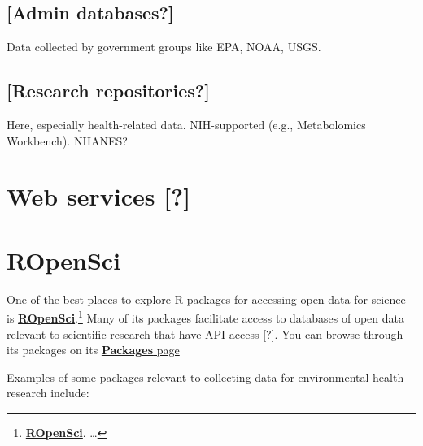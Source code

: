 \documentclass[]{tufte-book}
\begin{document}
\hypertarget{admin-databases}{%
\subsection{{[}Admin databases?{]}}\label{admin-databases}}

Data collected by government groups like EPA, NOAA, USGS.

\hypertarget{research-repositories}{%
\subsection{{[}Research repositories?{]}}\label{research-repositories}}

Here, especially health-related data.
NIH-supported (e.g., Metabolomics Workbench).
NHANES?

\hypertarget{web-services}{%
\section{Web services {[}?{]}}\label{web-services}}

\hypertarget{ropensci}{%
\section{ROpenSci}\label{ropensci}}

One of the best places to explore R packages for accessing open data for science is
\href{https://ropensci.org/}{\textbf{ROpenSci}}.\footnote{\href{https://ropensci.org/}{\textbf{ROpenSci}}. \ldots{}}
Many of its packages facilitate access to databases of open data relevant to scientific
research that have API access {[}?{]}. You can browse through its packages on
its \href{https://ropensci.org/packages/}{\textbf{Packages} page}

Examples of some packages relevant to collecting data for environmental health research
include:
\end{document}

